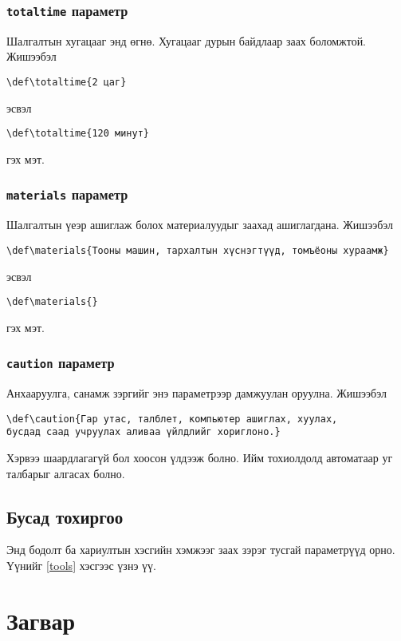 \documentclass[10pt]{article}
\theoremstyle{definition}
\begin{document}
\subsubsection{\texttt{totaltime} параметр}

Шалгалтын хугацааг энд өгнө. Хугацааг дурын байдлаар заах боломжтой. Жишээбэл
\begin{verbatim}
\def\totaltime{2 цаг}
\end{verbatim}
эсвэл
\begin{verbatim}
\def\totaltime{120 минут}
\end{verbatim}
гэх мэт.

\subsubsection{\texttt{materials} параметр}

Шалгалтын үеэр ашиглаж болох материалуудыг заахад ашиглагдана. Жишээбэл
\begin{verbatim}
\def\materials{Тооны машин, тархалтын хүснэгтүүд, томъёоны хураамж}
\end{verbatim}
эсвэл
\begin{verbatim}
\def\materials{}
\end{verbatim}
гэх мэт.

\subsubsection{\texttt{caution} параметр}

Анхааруулга, санамж зэргийг энэ параметрээр дамжуулан оруулна. Жишээбэл 
\begin{verbatim}
\def\caution{Гар утас, талблет, компьютер ашиглах, хуулах, 
бусдад саад учруулах аливаа үйлдлийг хориглоно.}
\end{verbatim}
Хэрвээ шаардлагагүй бол хоосон үлдээж болно. Ийм тохиолдолд автоматаар уг талбарыг алгасах болно.

\subsection{Бусад тохиргоо}

Энд бодолт ба хариултын хэсгийн хэмжээг заах зэрэг тусгай параметрүүд орно. Үүнийг \ref{tools} хэсгээс үзнэ үү.

\section{Загвар}
\end{document}
